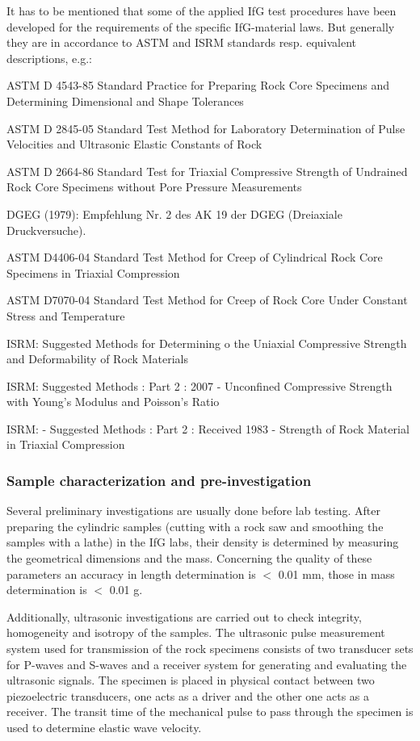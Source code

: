 It has to be mentioned that some of the applied IfG test procedures have been developed for the requirements of the specific IfG-material laws. 
But generally they are in accordance to ASTM and ISRM standards resp. equivalent descriptions, e.g.:

\begin{list}{-}{\leftmargin=1em \itemindent=0em \itemsep=0.1em}
\item ASTM D 4543-85 Standard Practice for Preparing Rock Core Specimens and Determining Dimensional and Shape Tolerances
\item ASTM D 2845-05 Standard Test Method for Laboratory Determination of Pulse Velocities and Ultrasonic Elastic Constants of Rock
\item ASTM D 2664-86 Standard Test for Triaxial Compressive Strength of Undrained Rock Core Specimens without Pore Pressure Measurements 
\item DGEG (1979):   Empfehlung Nr. 2 des AK 19 der DGEG (Dreiaxiale Druckversuche).
\item ASTM D4406-04 Standard Test Method for Creep of Cylindrical Rock Core Specimens in Triaxial Compression
\item ASTM D7070-04 Standard Test Method for Creep of Rock Core Under Constant Stress and Temperature
\item ISRM: Suggested Methods for Determining o the Uniaxial Compressive Strength and Deformability of Rock Materials
\item ISRM: Suggested Methods : Part 2 : 2007 - Unconfined Compressive Strength with Young's Modulus and Poisson's Ratio
\item ISRM: - Suggested Methods : Part 2 : Received 1983 - Strength of Rock Material in Triaxial Compression
\end{list}

\subsubsection{Sample characterization and pre-investigation}

Several preliminary investigations are usually done before lab testing. After preparing the cylindric samples (cutting with a rock saw and smoothing the samples with a lathe) in the IfG labs, their density is determined by measuring the geometrical dimensions and the mass. Concerning the quality of these parameters an accuracy in length determination is $<$ 0.01 mm, those in mass determination is $<$ 0.01 g. 

Additionally, ultrasonic investigations are carried out to check integrity, homogeneity and isotropy of the samples. The ultrasonic pulse measurement system used for transmission of the rock specimens consists of two transducer sets for P-waves and S-waves and a receiver system for generating and evaluating the ultrasonic signals. The specimen is placed in physical contact between two piezoelectric transducers, one acts as a driver and the other one acts as a receiver. The transit time of the mechanical pulse to pass through the specimen is used to determine elastic wave velocity.

